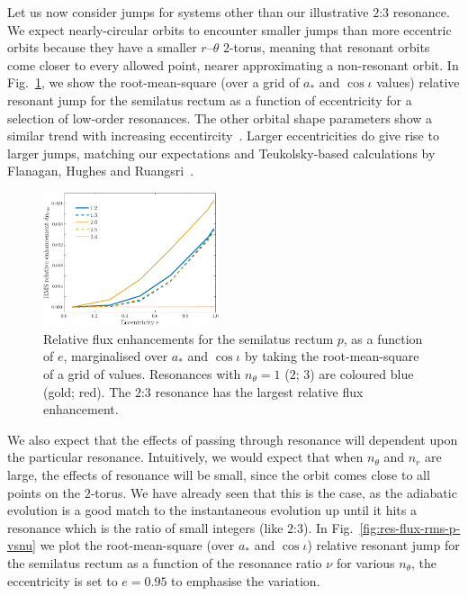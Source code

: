 \documentclass[aps,prd,amsfonts,amssymb,amsmath,nofootinbib,showpacs,superscriptaddress,twocolumn,floatfix]{revtex4-1}
\newcommand{\figref}[1]{Fig.~\ref{fig:#1}}
\begin{document}
Let us now consider jumps for systems other than our illustrative $2$:$3$ resonance. We expect nearly-circular orbits to encounter smaller jumps than more eccentric orbits because they have a smaller $r$--$\theta$ $2$-torus, meaning that resonant orbits come closer to every allowed point, nearer approximating a non-resonant orbit. In \figref{res-flux-rms-p}, we show the root-mean-square (over a grid of $a_\ast$ and $\cos\iota$ values) relative resonant jump for the semilatus rectum as a function of eccentricity for a selection of low-order resonances. The other orbital shape parameters show a similar trend with increasing eccentircity~\cite{ColeThesis2015}. Larger eccentricities do give rise to larger jumps, matching our expectations and Teukolsky-based calculations by Flanagan, Hughes and Ruangsri~\cite{Flanagan2012a}.

\begin{figure}
\centering
\includegraphics[width=0.46\textwidth]{Fig_e_rms_p}
\caption{\label{fig:res-flux-rms-p}Relative flux enhancements for the semilatus rectum $p$, as a function of $e$, marginalised over $a_\ast$ and $\cos\iota$ by taking the root-mean-square of a grid of values. Resonances with $n_\theta = 1$ ($2$; $3$) are coloured blue (gold; red). The $2$:$3$ resonance has the largest relative flux enhancement.}
\end{figure}

We also expect that the effects of passing through resonance will dependent upon the particular resonance. Intuitively, we would expect that when $n_\theta$ and $n_r$ are large, the effects of resonance will be small, since the orbit comes close to all points on the $2$-torus. We have already seen that this is the case, as the adiabatic evolution is a good match to the instantaneous evolution up until it hits a resonance which is the ratio of small integers (like $2$:$3$). In \figref{res-flux-rms-p-vsnu} we plot the root-mean-square (over $a_\ast$ and $\cos\iota$) relative resonant jump for the semilatus rectum as a function of the resonance ratio $\nu$ for various $n_\theta$, the eccentricity is set to $e=0.95$ to emphasise the variation.
\end{document}
